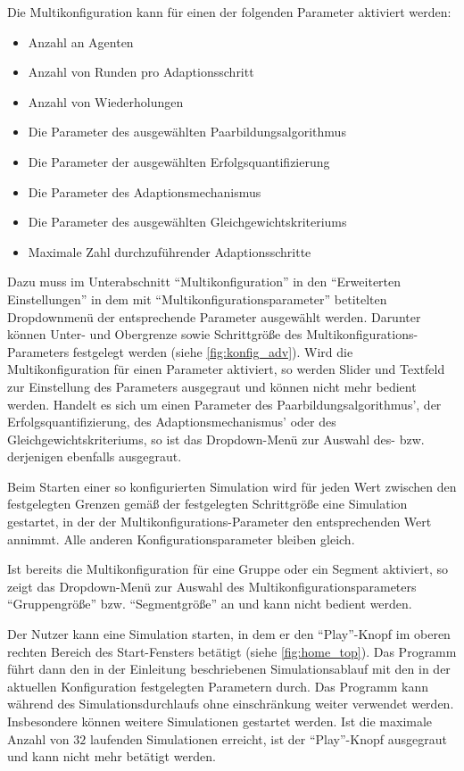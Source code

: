 \documentclass[parskip=full,11pt]{scrartcl}
\def\adapt{Adaptionsschritt}
\begin{document}
Die Multikonfiguration kann für einen der folgenden Parameter aktiviert werden:
\begin{itemize} \itemsep -10pt
\item Anzahl an Agenten
\item Anzahl von Runden pro \adapt
\item Anzahl von Wiederholungen
\item Die Parameter des ausgewählten Paarbildungsalgorithmus
\item Die Parameter der ausgewählten Erfolgsquantifizierung
\item Die Parameter des Adaptionsmechanismus 
\item Die Parameter des ausgewählten Gleichgewichtskriteriums
\item Maximale Zahl durchzuführender Adaptionsschritte
\end{itemize}
Dazu muss im Unterabschnitt \enquote{Multikonfiguration} in den \enquote{Erweiterten Einstellungen} in dem mit \enquote{Multikonfigurationsparameter} betitelten Dropdownmenü der entsprechende Parameter ausgewählt werden. Darunter können Unter- und Obergrenze sowie Schrittgröße des Multikonfigurations-Parameters festgelegt werden (siehe \cref{fig:konfig_adv}). Wird die Multikonfiguration für einen Parameter aktiviert, so werden Slider und Textfeld zur Einstellung des Parameters ausgegraut und können nicht mehr bedient werden. Handelt es sich um einen Parameter des Paarbildungsalgorithmus', der Erfolgsquantifizierung, des Adaptionsmechanismus' oder des Gleichgewichtskriteriums, so ist das Dropdown-Menü zur Auswahl des- bzw. derjenigen ebenfalls ausgegraut.

Beim Starten einer so konfigurierten Simulation wird für jeden Wert zwischen den festgelegten Grenzen gemäß der festgelegten Schrittgröße eine Simulation gestartet, in der der Multikonfigurations-Parameter den entsprechenden Wert annimmt. Alle anderen Konfigurationsparameter bleiben gleich.

Ist bereits die Multikonfiguration für eine Gruppe oder ein Segment aktiviert, so zeigt das Dropdown-Menü zur Auswahl des Multikonfigurationsparameters \enquote{Gruppengröße} bzw. \enquote{Segmentgröße} an und kann nicht bedient werden.

Der \Gls{Nutzer} kann eine Simulation starten, in dem er den \enquote{Play}-Knopf im oberen rechten Bereich des Start-Fensters betätigt (siehe \cref{fig:home_top}). Das Programm führt dann den in der Einleitung beschriebenen Simulationsablauf mit den in der aktuellen \Gls{Konfiguration} festgelegten Parametern durch. Das Programm kann während des Simulationsdurchlaufs ohne einschränkung weiter verwendet werden. Insbesondere können weitere Simulationen gestartet werden. Ist die maximale Anzahl von \(32\) laufenden Simulationen erreicht, ist der \enquote{Play}-Knopf ausgegraut und kann nicht mehr betätigt werden.
\end{document}
